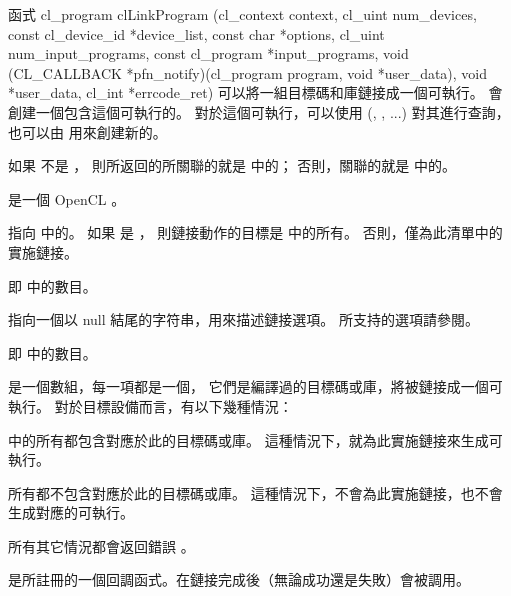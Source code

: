 函式
\startclc
cl_program clLinkProgram (cl_context context,
			cl_uint num_devices,
			const cl_device_id *device_list,
			const char *options,
			cl_uint num_input_programs,
			const cl_program *input_programs,
			void (CL_CALLBACK *pfn_notify)(cl_program program,
						void *user_data),
			void *user_data,
cl_int *errcode_ret)
\stopclc
可以將一組目標碼和庫鏈接成一個可執行。
  會創建一個包含這個可執行的。
對於這個可執行，可以使用 (,
 , ...) 對其進行查詢，
也可以由  用來創建新的。

如果  不是 ，
則所返回的所關聯的就是  中的；
否則，關聯的就是  中的。

 是一個 OpenCL 。

 指向  中的。
如果  是 ，
則鏈接動作的目標是  中的所有。
否則，僅為此清單中的實施鏈接。

 即  中的數目。

 指向一個以 null 結尾的字符串，用來描述鏈接選項。
所支持的選項請參閱。

 即  中的數目。

 是一個數組，每一項都是一個，
它們是編譯過的目標碼或庫，將被鏈接成一個可執行。
對於目標設備而言，有以下幾種情況：
\startigBase
\item {} 中的所有都包含對應於此的目標碼或庫。
這種情況下，就為此實施鏈接來生成可執行。

\item 所有都不包含對應於此的目標碼或庫。
這種情況下，不會為此實施鏈接，也不會生成對應的可執行。

\item 所有其它情況都會返回錯誤 。
\stopigBase

 是所註冊的一個回調函式。在鏈接完成後（無論成功還是失敗）會被調用。

